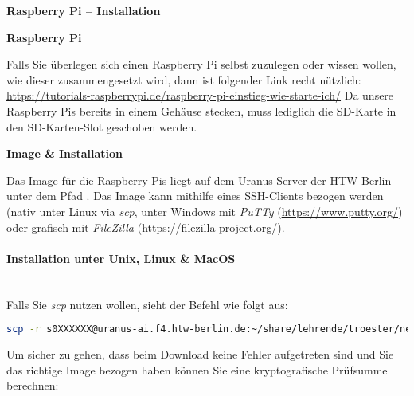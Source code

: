 \documentclass[paper=a4,fontsize=11pt]{scrartcl}%
\numberwithin{equation}{section}
\begin{document}
\begin{center}
\Large{\textbf{Raspberry Pi -- Installation}}
\end{center}
\begin{center}\Large{\textbf{Raspberry Pi}}\end{center}\vskip0.25in
Falls Sie überlegen sich einen Raspberry Pi selbst zuzulegen oder wissen wollen, wie dieser zusammengesetzt wird, dann ist folgender Link recht nützlich:\\
\url{https://tutorials-raspberrypi.de/raspberry-pi-einstieg-wie-starte-ich/}
Da unsere Raspberry Pis bereits in einem Gehäuse stecken, muss lediglich die SD-Karte in den SD-Karten-Slot geschoben werden.
\begin{center}\Large{\textbf{Image \& Installation}}\end{center}\vskip0.25in
Das Image für die Raspberry Pis liegt auf dem Uranus-Server der HTW Berlin unter dem Pfad . Das Image kann mithilfe eines SSH-Clients bezogen werden (nativ unter Linux via \emph{scp}, unter Windows mit \emph{PuTTy} (\url{https://www.putty.org/}) oder grafisch mit \emph{FileZilla} (\url{https://filezilla-project.org/}).
\paragraph{Installation unter Unix, Linux \& MacOS}~\\
Falls Sie \emph{scp} nutzen wollen, sieht der Befehl wie folgt aus:
\begin{lstlisting}[style=Bash, language=Bash]
scp -r s0XXXXXX@uranus-ai.f4.htw-berlin.de:~/share/lehrende/troester/netzwerke/rpi/ ~/
		\end{lstlisting}
Um sicher zu gehen, dass beim Download keine Fehler aufgetreten sind und Sie das richtige Image bezogen haben können Sie eine kryptografische Prüfsumme berechnen:
\end{document}
